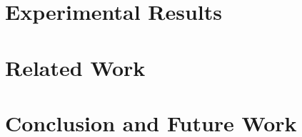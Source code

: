 \documentclass[fleqn,10pt]{SelfArx} %
\begin{document}

\section{Experimental Results}
\label{sec:expresults}




\section{Related Work}
\label{sec:relatedwork}




\section{Conclusion and Future Work}
\label{sec:conclusion}







\end{document}
